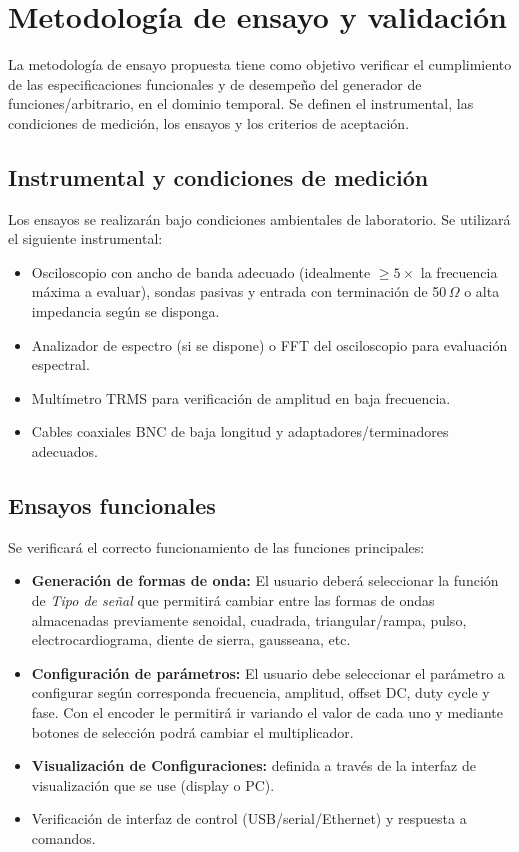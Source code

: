 \newpage

\section{Metodología de ensayo y validación}
La metodología de ensayo propuesta tiene como objetivo verificar el cumplimiento de las especificaciones funcionales y de desempeño del generador de funciones/arbitrario, en el dominio temporal. Se definen el instrumental, las condiciones de medición, los ensayos y los criterios de aceptación.

\subsection{Instrumental y condiciones de medición}
Los ensayos se realizarán bajo condiciones ambientales de laboratorio. Se utilizará el siguiente instrumental:
\begin{itemize}
	\item Osciloscopio con ancho de banda adecuado (idealmente $\geq 5\times$ la frecuencia máxima a evaluar), sondas pasivas y entrada con terminación de 50\,$\Omega$ o alta impedancia según se disponga.
	\item Analizador de espectro (si se dispone) o FFT del osciloscopio para evaluación espectral.
	\item Multímetro TRMS para verificación de amplitud en baja frecuencia.
	\item Cables coaxiales BNC de baja longitud y adaptadores/terminadores adecuados.
\end{itemize}

\subsection{Ensayos funcionales}
Se verificará el correcto funcionamiento de las funciones principales:
\begin{itemize}
	\item \textbf{Generación de formas de onda:} El usuario deberá seleccionar la función de \textit{Tipo de señal} que permitirá cambiar entre las formas de ondas almacenadas previamente senoidal, cuadrada, triangular/rampa, pulso, electrocardiograma, diente de sierra, gausseana, etc.
	\item \textbf{Configuración de parámetros:} El usuario debe seleccionar el parámetro a configurar según corresponda frecuencia, amplitud, offset DC, duty cycle y fase. Con el encoder le permitirá ir variando el valor de cada uno y mediante botones de selección podrá cambiar el multiplicador.
	\item \textbf{Visualización de Configuraciones:} definida a través de la interfaz de visualización que se use (display o PC).
	\item Verificación de interfaz de control (USB/serial/Ethernet) y respuesta a comandos.
\end{itemize}

